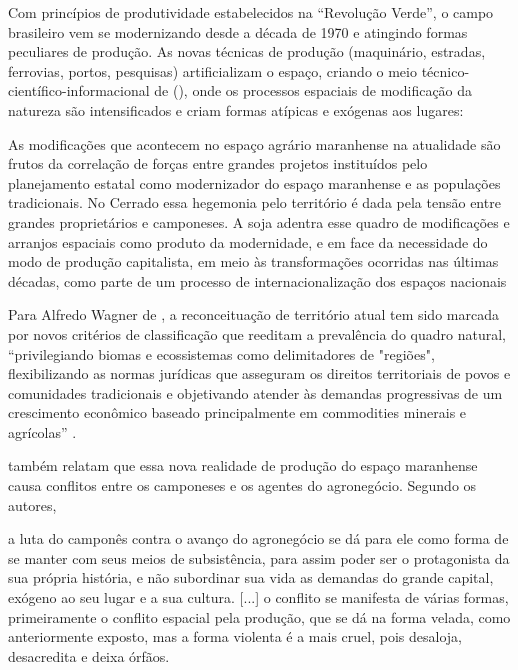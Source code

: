 Com princípios de produtividade estabelecidos na “Revolução Verde”, o campo brasileiro vem se modernizando desde a década de 1970 e atingindo formas peculiares de produção. As novas técnicas de produção (maquinário, estradas, ferrovias, portos, pesquisas) artificializam o espaço, criando o meio técnico-científico-informacional de  (\citeyear{santos1996}), onde os processos espaciais de modificação da natureza são intensificados e criam formas atípicas e exógenas aos lugares:

\begin{citacao}
As modificações que acontecem no espaço agrário maranhense na atualidade são frutos da correlação de forças entre grandes projetos instituídos pelo planejamento estatal como modernizador do espaço maranhense e as populações tradicionais. No Cerrado essa hegemonia pelo território é dada pela tensão entre grandes proprietários e camponeses. A soja adentra esse quadro de modificações e arranjos espaciais como produto da 
modernidade, e em face da necessidade do modo de produção capitalista, em meio às transformações ocorridas nas últimas décadas, como parte de um processo de internacionalização dos espaços nacionais  \cite[p. 3]{rodrigues_alencar}
\end{citacao}

Para Alfredo Wagner de , a reconceituação de território atual tem sido marcada por novos critérios de classificação que reeditam a prevalência do quadro natural, “privilegiando biomas e ecossistemas como delimitadores de "regiões", flexibilizando as normas jurídicas que asseguram os direitos territoriais de povos e comunidades tradicionais e objetivando atender às demandas progressivas de um crescimento econômico baseado principalmente em commodities minerais e agrícolas” \cite{almeida}.

 também relatam que essa nova realidade de produção do espaço maranhense causa conflitos entre os camponeses e os agentes do agronegócio. Segundo os autores, 

\begin{citacao}
a luta do camponês contra o avanço do agronegócio se dá para ele como forma de se manter com seus meios de subsistência, para assim poder ser o protagonista da sua própria história, e não subordinar sua vida as demandas do grande capital, exógeno ao seu lugar e a sua cultura. [...] o conflito se manifesta de várias formas, primeiramente o conflito espacial pela produção, que se dá na forma velada, como anteriormente exposto, mas a forma violenta é a mais cruel, pois desaloja, desacredita e deixa órfãos. \cite[p. 10]{rodrigues_alencar}
\end{citacao}

